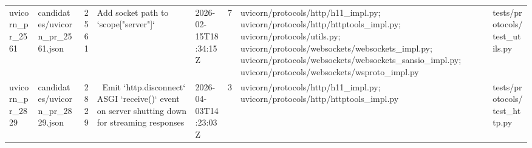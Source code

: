 \begin{tabular}{llrllrll}
uvicorn\_pr\_2561 & candidates/uvicorn\_pr\_2561.json & 2561 & Add socket path to `scope["server"]` & 2026-02-15T18:34:15Z & 7 & uvicorn/protocols/http/h11\_impl.py; uvicorn/protocols/http/httptools\_impl.py; uvicorn/protocols/utils.py; uvicorn/protocols/websockets/websockets\_impl.py; uvicorn/protocols/websockets/websockets\_sansio\_impl.py; uvicorn/protocols/websockets/wsproto\_impl.py & tests/protocols/test\_utils.py \\
uvicorn\_pr\_2829 & candidates/uvicorn\_pr\_2829.json & 2829 & 🐛 Emit `http.disconnect` ASGI `receive()` event on server shutting down for streaming responses & 2026-04-03T14:23:03Z & 3 & uvicorn/protocols/http/h11\_impl.py; uvicorn/protocols/http/httptools\_impl.py & tests/protocols/test\_http.py \\
\bottomrule
\end{tabular}
